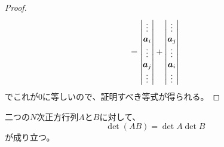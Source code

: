\begin{proof}
$$= \begin{vmatrix}\vdots \\ \vb*{a}_i \\ \vdots \\ \vb*{a}_j \\ \vdots\end{vmatrix}
+\begin{vmatrix}\vdots \\ \vb*{a}_j \\ \vdots \\ \vb*{a}_i \\ \vdots\end{vmatrix}
$$
でこれが$0$に等しいので、証明すべき等式が得られる。
\end{proof}

\begin{proposition}[積の行列式]
\label{t:proddet}
二つの$N$次正方行列$A$と$B$に対して、
$$
\det(A B) = \det A\det B
$$
が成り立つ。
\end{proposition}

